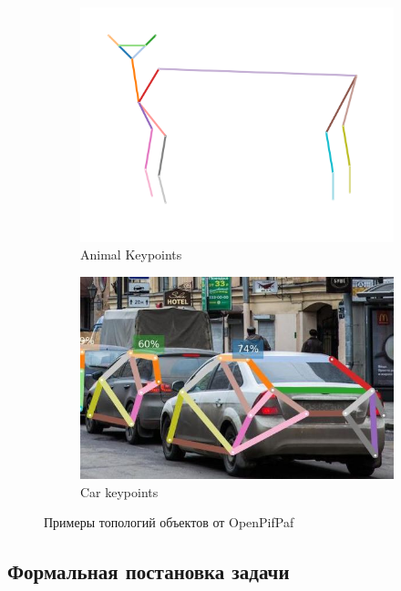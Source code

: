 \begin{figure}[h]
\begin{subfigure}[b]{0.48\textwidth}
	\centering
	\includegraphics[width=\textwidth]{./images/plugins_animalpose.png}
	\caption{Animal Keypoints}
\end{subfigure}
\begin{subfigure}[b]{0.48\textwidth}
	\centering
	\includegraphics[width=\textwidth]{./images/car_topology.jpg}
	\caption{Car keypoints}
\end{subfigure}
	\caption{Примеры топологий объектов от OpenPifPaf \cite{OpenPifPaf2021}}
	\label{fig:topology_exaples}
\end{figure}

\subsection{Формальная постановка задачи}
\label{subsec:keypoint_task}


